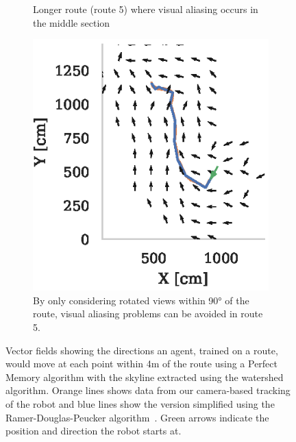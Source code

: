 \documentclass[letterpaper]{article}
\begin{document}
\begin{figure}[t]
\begin{subfigure}[t]{0.3\textwidth}
        \caption{Longer route (route 5) where visual aliasing occurs in the middle section}
        \label{fig:vector_fields/route5_perfect_memory_mask}
    \end{subfigure}
    \begin{subfigure}[t]{0.3\textwidth}
        \includegraphics{figures/vector_field_route5_PerfectMemoryConstrained_mask.eps}
        \caption{By only considering rotated views within 90° of the route, visual aliasing problems can be avoided in route 5.}
        \label{fig:vector_fields/route5_perfect_memory_constrained_mask}
    \end{subfigure}
    
    \caption{Vector fields showing the directions an agent, trained on a route, would move at each point within 4m of the route using a Perfect Memory algorithm with the skyline extracted using the watershed algorithm. 
    Orange lines shows data from our camera-based tracking of the robot and blue lines show the version simplified using the Ramer-Douglas-Peucker algorithm~\citep{Ramer1972}.
    Green arrows indicate the position and direction the robot starts at.}
    \label{fig:vector_fields}
\end{figure}
\end{document}
